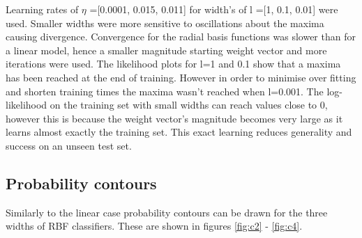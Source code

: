 \documentclass[twoside,twocolumn]{article}
\begin{document}
Learning rates of $\eta$ =[0.0001, 0.015, 0.011] for width's of l =[1, 0.1, 0.01] were used. Smaller widths were more sensitive to oscillations about the maxima causing divergence. Convergence for the radial basis functions was slower than for a linear model, hence a smaller magnitude starting weight vector and more iterations were used. The likelihood plots for l=1 and 0.1 show that a maxima has been reached at the end of training. However in order to minimise over fitting and shorten training times the maxima wasn't reached when l=0.001. The log-likelihood on the training set with small widths can reach values close to 0, however this is because the weight vector's magnitude becomes very large as it learns almost exactly the training set. This exact learning reduces generality and success on an unseen test set.
\subsection{Probability contours}
Similarly to the linear case probability contours can be drawn for the three widths of RBF classifiers. These are shown in figures \ref{fig:c2} - \ref{fig:c4}.
\end{document}
